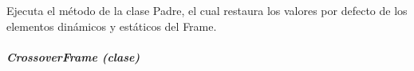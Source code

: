 \documentclass[class=report, crop=false]{standalone}
\begin{document}
\begin{fulllineitems}
\begin{fulllineitems}
\end{fulllineitems}

\begin{fulllineitems}

Ejecuta el método de la clase Padre, el cual restaura los 
valores por defecto de los elementos dinámicos y estáticos 
del Frame.

\end{fulllineitems}

\end{fulllineitems}

\subparagraph{CrossoverFrame (clase)}
\label{sec:a_3_2_5_2_2}
\end{document}
